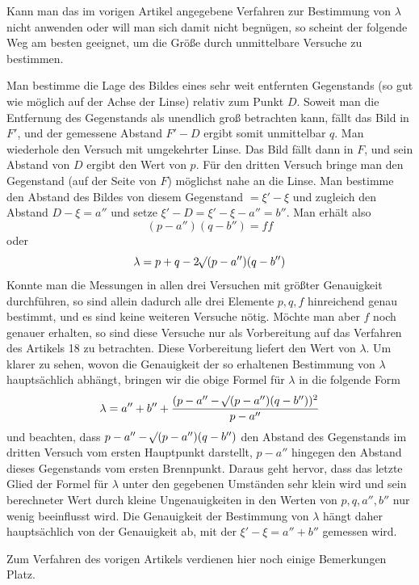 Kann man das im vorigen Artikel angegebene Verfahren zur Bestimmung von $\lambda$ nicht anwenden oder will man sich damit nicht begnügen, so scheint der folgende Weg am besten geeignet, um die Größe durch unmittelbare Versuche zu bestimmen.

Man bestimme die Lage des Bildes eines sehr weit entfernten Gegenstands (so gut wie möglich auf der Achse der Linse) relativ zum Punkt $D$. Soweit man die Entfernung des Gegenstands als unendlich groß betrachten kann, fällt das Bild
in $F'$, und der gemessene Abstand $F'-D$ ergibt somit unmittelbar $q$. Man wiederhole den Versuch mit umgekehrter Linse. Das Bild fällt dann in $F$, und sein Abstand von $D$ ergibt den Wert von $p$. Für den dritten Versuch bringe man den Gegenstand (auf der Seite von $F$) möglichst nahe an die Linse. Man bestimme den Abstand des Bildes von diesem Gegenstand $=\xi'-\xi$ und zugleich den Abstand $D-\xi=a''$ und setze $\xi'-D=\xi'-\xi-a''=b''$. Man erhält also
\[
(p-a'')(q-b'')=ff
\]
oder
\[
\lambda=p+q-2\mathord{{}^{}\!\surd}(p-a'')(q-b'')
\]
Konnte man die Messungen in allen drei Versuchen mit größter Genauigkeit durchführen, so sind allein dadurch alle drei Elemente $p,q,f$ hinreichend genau bestimmt, und es sind keine weiteren Versuche nötig. Möchte man aber $f$ noch genauer erhalten, so sind diese Versuche nur als Vorbereitung auf das Verfahren des Artikels 18 zu betrachten. Diese Vorbereitung liefert den Wert von $\lambda$. Um klarer zu sehen, wovon die Genauigkeit der so erhaltenen Bestimmung von $\lambda$ hauptsächlich abhängt, bringen wir die obige Formel für $\lambda$ in die folgende Form
\[
\lambda=a''+b''+\frac{(p-a''-\mathord{{}^{}\!\surd}(p-a'')(q-b''))^2}{p-a''}
\]
und beachten, dass $p-a''-\mathord{{}^{}\!\surd}(p-a'')(q-b'')$ den Abstand des Gegenstands im dritten Versuch vom ersten Hauptpunkt darstellt, $p-a''$ hingegen den Abstand dieses Gegenstands vom ersten Brennpunkt. Daraus geht hervor, dass das letzte Glied der Formel für $\lambda$ unter den gegebenen Umständen sehr klein wird und sein berechneter Wert durch kleine Ungenauigkeiten in den Werten von $p,q,a'',b''$ nur wenig beeinflusst wird. Die Genauigkeit der Bestimmung von $\lambda$ hängt daher hauptsächlich von der Genauigkeit ab, mit der $\xi'-\xi=a''+b''$ gemessen wird.

Zum Verfahren des vorigen Artikels verdienen hier noch einige Bemerkungen Platz.

